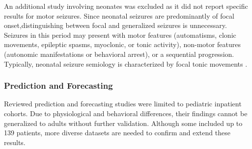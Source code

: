 An additional study \cite{Chen2023-ns} involving neonates was excluded as it did not report specific results for motor seizures. Since neonatal seizures are predominantly of focal onset,distinguishing between focal and generalized seizures is unnecessary. Seizures in this period may present with motor features (automatisms, clonic movements, epileptic spasms, myoclonic, or tonic activity), non-motor features (autonomic manifestations or behavioral arrest), or a sequential progression. Typically, neonatal seizure semiology is characterized by focal tonic movements \cite{Ziobro24-neo}.

\subsubsection{Prediction and Forecasting}
Reviewed prediction and forecasting studies were limited to pediatric inpatient cohorts. Due to physiological and behavioral differences, their findings cannot be generalized to adults without further validation. Although some included up to 139 patients, more diverse datasets are needed to confirm and extend these results.